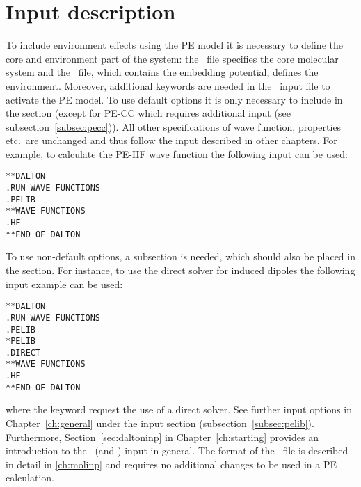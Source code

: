 \section{Input description}
To include environment effects using the PE model it
is necessary to define the core and environment part of the system: the \molinp\
file specifies the core molecular system and the \potinp\ file, which contains
the embedding potential, defines the environment. Moreover, additional
keywords are needed in the \dalinp\ input file to activate the PE model. To use
default options it is only necessary to include \Key{PELIB} in the \Sec{*DALTON}
section (except for PE-CC which requires additional input (see subsection~\ref{subsec:pecc})).
All other specifications of wave function, properties etc.\ are
unchanged and thus follow the input described in other chapters. For example, to
calculate the PE-HF wave function the following input can be used:
\begin{verbatim}
**DALTON
.RUN WAVE FUNCTIONS
.PELIB
**WAVE FUNCTIONS
.HF
**END OF DALTON
\end{verbatim}
To use non-default options, a  subsection is needed, which should also be placed in the
\Sec{*DALTON} section. For instance, to use the direct solver for induced
dipoles the following input example can be used:
\begin{verbatim}
**DALTON
.RUN WAVE FUNCTIONS
.PELIB
*PELIB
.DIRECT
**WAVE FUNCTIONS
.HF
**END OF DALTON
\end{verbatim}
where the  keyword request the use of a direct solver. See further
input options in Chapter~\ref{ch:general} under the \Sec{PELIB}
input section (subsection~\ref{subsec:pelib}). Furthermore,
Section~\ref{sec:daltoninp} in Chapter~\ref{ch:starting} provides an
introduction to the \dalton\ (and \molinp) input in general. The format of the
\molinp\ file is described in detail in \ref{ch:molinp} and requires no
additional changes to be used in a PE calculation.

